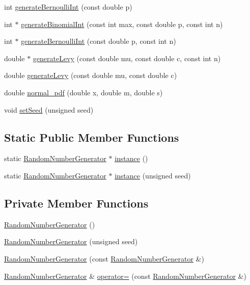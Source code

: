 \begin{DoxyCompactItemize}
int \hyperlink{class_random_number_generator_a480c13d951cbcc9dd3a3afa29145c097}{generate\+Bernoulli\+Int} (const double p)
\item 
int $\ast$ \hyperlink{class_random_number_generator_a5b95ab4b064f39c8bdbb14af938efc0e}{generate\+Binomial\+Int} (const int max, const double p, const int n)
\item 
int $\ast$ \hyperlink{class_random_number_generator_a2b52648a0de3e6da4c51a0f9b30a67f0}{generate\+Bernoulli\+Int} (const double p, const int n)
\item 
double $\ast$ \hyperlink{class_random_number_generator_acd8f93f595d980ee054ad4570a09b0b7}{generate\+Levy} (const double mu, const double c, const int n)
\item 
double \hyperlink{class_random_number_generator_af9b46e3e695ca90479236807d14e92a5}{generate\+Levy} (const double mu, const double c)
\item 
double \hyperlink{class_random_number_generator_a4e661a49e8dd66e13c313c99adefddb0}{normal\+\_\+pdf} (double x, double m, double s)
\item 
void \hyperlink{class_random_number_generator_a20e812772b0544720b32256911e372e2}{set\+Seed} (unsigned seed)
\end{DoxyCompactItemize}
\subsection*{Static Public Member Functions}
\begin{DoxyCompactItemize}
\item 
static \hyperlink{class_random_number_generator}{Random\+Number\+Generator} $\ast$ \hyperlink{class_random_number_generator_ab20e4f6dae4e1d216357d26675488e45}{instance} ()
\item 
static \hyperlink{class_random_number_generator}{Random\+Number\+Generator} $\ast$ \hyperlink{class_random_number_generator_acb83c75147d9d2bff7b3e3f45239ecb1}{instance} (unsigned seed)
\end{DoxyCompactItemize}
\subsection*{Private Member Functions}
\begin{DoxyCompactItemize}
\item 
\hyperlink{class_random_number_generator_a8e7e711ea58f13f3ed95becbe33684e9}{Random\+Number\+Generator} ()
\item 
\hyperlink{class_random_number_generator_acef4ebf02f3377b707787aa1f69aff1d}{Random\+Number\+Generator} (unsigned seed)
\item 
\hyperlink{class_random_number_generator_a0007ec836f6bb43c27e2082264189c4c}{Random\+Number\+Generator} (const \hyperlink{class_random_number_generator}{Random\+Number\+Generator} \&)
\item 
\hyperlink{class_random_number_generator}{Random\+Number\+Generator} \& \hyperlink{class_random_number_generator_a5986c38214e8c774239eee89c768f172}{operator=} (const \hyperlink{class_random_number_generator}{Random\+Number\+Generator} \&)
\end{DoxyCompactItemize}
